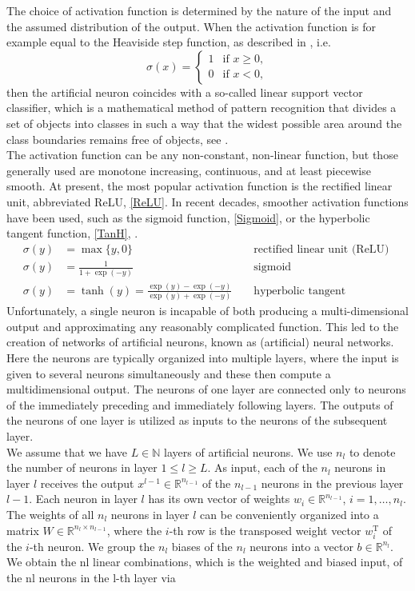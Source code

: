 The choice of activation function is determined by the nature of the input and the assumed distribution of the output. When the activation function is for example equal to the Heaviside step function, as described in \cite{Rosenblatt:1958}, i.e.
\begin{equation*}
    \sigma(x) = \begin{cases} 1 & \text{if } x \geq 0, \\ 0 & \text{if } x < 0, \end{cases}
\end{equation*}
then the artificial neuron coincides with a so-called linear support vector classifier, which is a mathematical method of pattern recognition that divides a set of objects into classes in such a way that the widest possible area around the class boundaries remains free of objects, see \cite[Chapter~7]{Bishop:2006}. \\
The activation function can be any non-constant, non-linear function, but those generally used are monotone increasing, continuous, and at least piecewise smooth. At present, the most popular activation function is the rectified linear unit, abbreviated ReLU, \cref{ReLU}. In recent decades, smoother activation functions have been used, such as the sigmoid function, \cref{Sigmoid}, or the hyperbolic tangent function, \cref{TanH}, \cite[p.~3]{LeCunBengioHinton:2015}.
\begin{align}
    \sigma(y) &=\max \{y, 0\} & & \text{ rectified linear unit (ReLU) } \label{ReLU} \\
    \sigma(y) &=\frac{1}{1+\exp (-y)} & & \text{ sigmoid } \label{Sigmoid} \\
    \sigma(y) &=\tanh (y)=\frac{\exp (y)-\exp (-y)}{\exp (y)+\exp (-y)} & & \text{ hyperbolic tangent } \label{TanH}
\end{align}
Unfortunately, a single neuron is incapable of both producing a multi-dimensional output and approximating any reasonably complicated function. This led to the creation of networks of artificial neurons, known as (artificial) neural networks. Here the neurons are typically organized into multiple layers, where the input is given to several neurons simultaneously and these then compute a multidimensional output. The neurons of one layer are connected only to neurons of the immediately preceding and immediately following layers. The outputs of the neurons of one layer is utilized as inputs to the neurons of the subsequent layer. \\
We assume that we have $L \in \mathbb{N}$ layers of artificial neurons. We use $n_l$ to denote the number of neurons in layer $1 \leq l \geq L$. As input, each of the $n_l$ neurons in layer $l$ receives the output $x^{l-1} \in \mathbb{R}^{n_{l-1}}$ of the $n_{l-1}$ neurons in the previous layer $l-1$. Each neuron in layer $l$ has its own vector of weights $w_i \in \mathbb{R}^{n_{l-1}}$, $i = 1, \ldots, n_l$. The weights of all $n_l$ neurons in layer $l$ can be conveniently organized into a matrix $W \in \mathbb{R}^{n_l \times n_{l-1}}$, where the $i$-th row is the transposed weight vector $w^{\mathrm{T}}_i$ of the $i$-th neuron. We group the $n_l$ biases of the $n_l$ neurons into a vector $b \in \mathbb{R}^{n_l}$. We obtain the nl linear combinations, which is the weighted and biased input, of the nl neurons in the l-th layer via 
